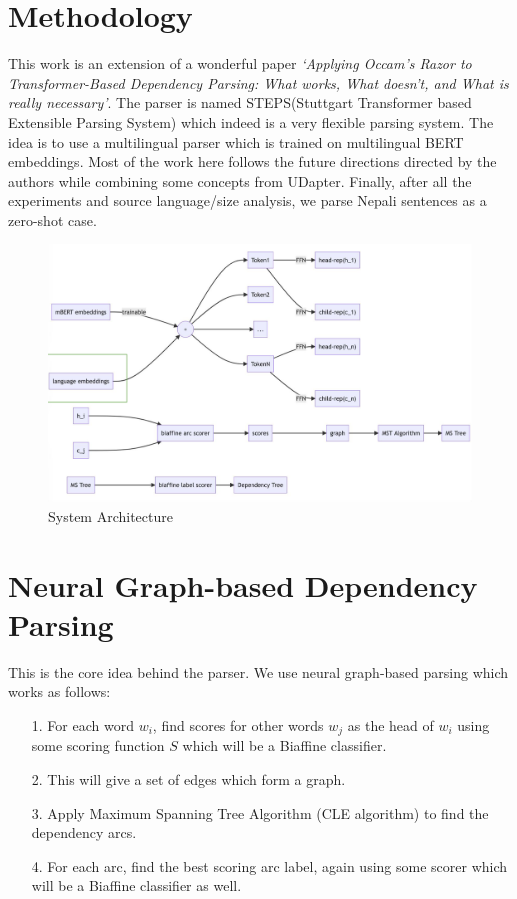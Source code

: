 \section{Methodology}
This work is an extension of a wonderful paper \textit{`Applying Occam's Razor
to Transformer-Based Dependency Parsing: What works, What doesn't, and What is
really necessary'}\cite{steps-parser}. The parser is named STEPS(Stuttgart
Transformer based Extensible Parsing System) which indeed is a very flexible
parsing system. The idea is to use a multilingual parser which is trained on
multilingual BERT embeddings. Most of the work here follows the future
directions directed by the authors\cite{steps-parser} while combining some
concepts from UDapter\cite{udapter}. Finally, after all the experiments and
source language/size analysis, we parse Nepali sentences as a zero-shot case.

\begin{figure}[!h]
    \center
    \includegraphics[scale=0.15]{images/Thesis_Architecture}
    \caption{System Architecture}
    \label{system_architecture}
\end{figure}

\section{Neural Graph-based Dependency Parsing}
This is the core idea behind the parser. We use neural graph-based parsing which works as follows:
\begin{itemize}
    \item[1.] For each word $w_i$, find scores for other words $w_j$ as the head of $w_i$ using some scoring function $S$ which will be a Biaffine classifier.
    \item[2.] This will give a set of edges which form a graph.
    \item[3.] Apply Maximum Spanning Tree Algorithm (CLE algorithm) to find the dependency arcs.
    \item[4.] For each arc, find the best scoring arc label, again using some scorer which will be a Biaffine classifier as well.
\end{itemize}

